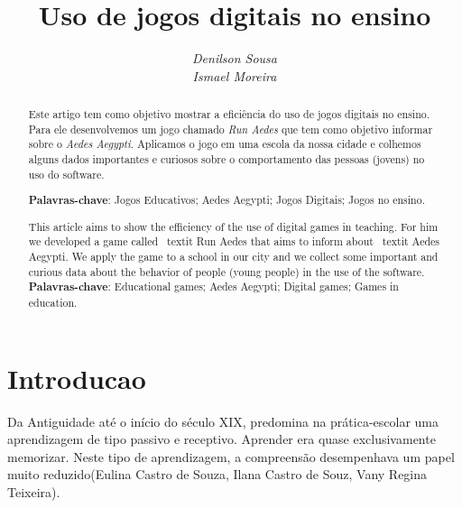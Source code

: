 \documentclass[12pt]{article}
\begin{document}
	
	\title{\textbf{Uso de jogos digitais no ensino}}
	\author{\textit{Denilson Sousa}\\\textit{Ismael Moreira}}
	
	\maketitle %

	\begin{abstract}
		Este artigo tem como objetivo mostrar a eficiência do uso de jogos digitais no ensino. Para ele desenvolvemos um jogo chamado \textit{Run Aedes} que tem como objetivo informar sobre o \textit{Aedes Aegypti}. Aplicamos o jogo em uma escola da nossa cidade e colhemos alguns dados importantes e curiosos sobre o comportamento das pessoas (jovens) no uso do software.
	
		\textbf{Palavras-chave}: Jogos Educativos; Aedes Aegypti; Jogos Digitais;  Jogos no ensino.	
	\end{abstract}


	\begin{abstract}
		This article aims to show the efficiency of the use of digital games in teaching. For him we developed a game called \ textit {Run Aedes} that aims to inform about \ textit {Aedes Aegypti}. We apply the game to a school in our city and we collect some important and curious data about the behavior of people (young people) in the use of the software. \\
			
		\textbf{Palavras-chave}: Educational games; Aedes Aegypti; Digital games; Games in education.	
	\end{abstract}
	
	
			
			
	\section{Introducao}%
	
	Da Antiguidade até o início do século XIX, predomina na prática-escolar uma aprendizagem de tipo passivo e receptivo. Aprender era quase exclusivamente memorizar. Neste tipo de aprendizagem, a compreensão desempenhava um papel muito reduzido(Eulina Castro de Souza, Ilana Castro de Souz, Vany Regina Teixeira).\\
	
\end{document}
